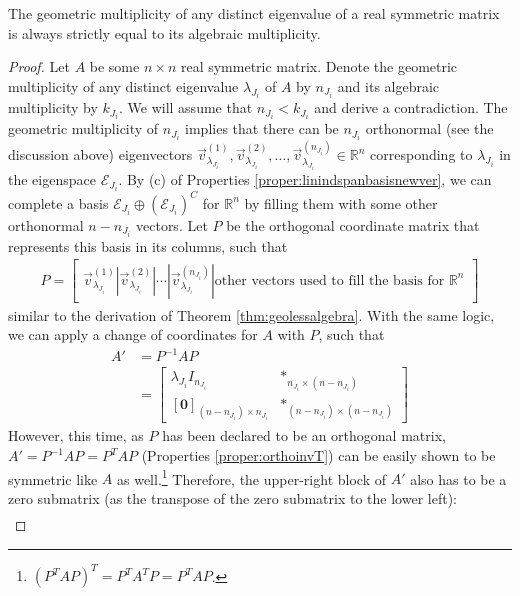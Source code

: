 \begin{proper}
\label{proper:symnodefic}
The geometric multiplicity of any distinct eigenvalue of a real symmetric matrix is always strictly equal to its algebraic multiplicity.
\end{proper}
\begin{proof}
Let $A$ be some $n \times n$ real symmetric matrix. Denote the geometric multiplicity of any distinct eigenvalue $\lambda_{J_i}$ of $A$ by $n_{J_i}$ and its algebraic multiplicity by $k_{J_i}$. We will assume that $n_{J_i} < k_{J_i}$ and derive a contradiction. The geometric multiplicity of $n_{J_i}$ implies that there can be $n_{J_i}$ orthonormal (see the discussion above) eigenvectors $\vec{v}^{(1)}_{\lambda_{J_i}}, \vec{v}^{(2)}_{\lambda_{J_i}}, \ldots, \vec{v}^{(n_{J_i})}_{\lambda_{J_i}} \in \mathbb{R}^n$ corresponding to $\lambda_{J_i}$ in the eigenspace $\mathcal{E}_{J_i}$. By (c) of Properties \ref{proper:linindspanbasisnewver}, we can complete a basis $\mathcal{E}_{J_i} \oplus (\mathcal{E}_{J_i})^C$ for $\mathbb{R}^n$ by filling them with some other orthonormal $n-n_{J_i}$ vectors. Let $P$ be the orthogonal coordinate matrix that represents this basis in its columns, such that
\begin{align*}
P = \begin{bmatrix}
\vec{v}^{(1)}_{\lambda_{J_i}} | \vec{v}^{(2)}_{\lambda_{J_i}} | \cdots | \vec{v}^{(n_{J_i})}_{\lambda_{J_i}} | \text{other vectors used to fill the basis for $\mathbb{R}^n$}
\end{bmatrix}
\end{align*}
similar to the derivation of Theorem \ref{thm:geolessalgebra}. With the same logic, we can apply a change of coordinates for $A$ with $P$, such that
\begin{align*}
A' &= P^{-1}AP \\
&= \begin{bmatrix}
\lambda_{J_i} I_{n_{J_i}} & *_{n_{J_i}\times(n-n_{J_i})} \\
[\textbf{0}]_{(n-n_{J_i})\times n_{J_i}} & *_{(n-n_{J_i})\times(n-n_{J_i})}
\end{bmatrix}
\end{align*}
However, this time, as $P$ has been declared to be an orthogonal matrix, $A' = P^{-1}AP = P^TAP$ (Properties \ref{proper:orthoinvT}) can be easily shown to be symmetric like $A$ as well.\footnote{$(P^TAP)^T = P^TA^TP = P^TAP$.} Therefore, the upper-right block of $A'$ also has to be a zero submatrix (as the transpose of the zero submatrix to the lower left):
\begin{align*}

\end{align*}
\end{proof}
